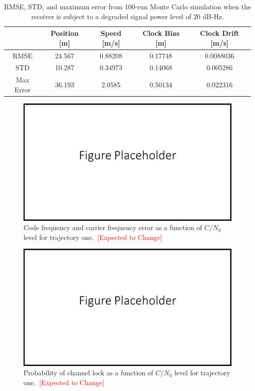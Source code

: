 \begin{table}[!ht]
    \caption{RMSE, STD, and maximum error from 100-run Monte Carlo simulation when the receiver is subject to a degraded signal power level of \(20\) dB-Hz.}\label{tbl:straight20CV}
    \centering
    \begin{tabular}{ccccc}
        \toprule
                  & Position [m] & Speed [m/s] & Clock Bias [m] & Clock Drift [m/s] \\
        \midrule
        RMSE      & 24.567       & 0.88208     & 0.17748        & 0.0088036         \\
        STD       & 10.287       & 0.34973     & 0.14068        & 0.005286          \\
        Max Error & 36.193       & 2.0585      & 0.50134        & 0.022316          \\
        \bottomrule
    \end{tabular}
\end{table}
\begin{figure}[!ht]
    \centering
    \includegraphics[width=\linewidth]{Figures/FigurePlaceholder.png}
    \caption{Code frequency and carrier frequency error as a function of \(C/N_0\) level for trajectory one.~\textcolor{red}{[Expected to Change]}}\label{fig:truecodefreqerrror1}
\end{figure}

\begin{figure}[!ht]
    \centering
    \includegraphics[width=\linewidth]{Figures/FigurePlaceholder.png}
    \caption{Probability of channel lock as a function of \(C/N_0\) level for trajectory one.~\textcolor{red}{[Expected to Change]}}\label{fig:trackingprobability1}
\end{figure}


